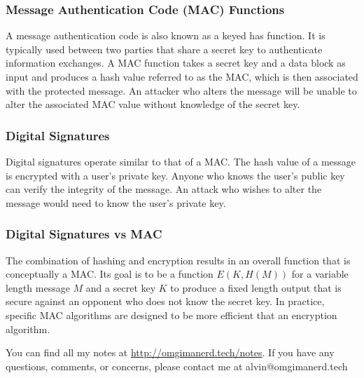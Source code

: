 \documentclass{math}
\begin{document}
\subsubsection*{Message Authentication Code (MAC) Functions}
A message authentication code is also known as a keyed has function. It is
typically used between two parties that share a secret key to authenticate
information exchanges. A MAC function takes a secret key and a data block as
input and produces a hash value referred to as the MAC, which is then associated
with the protected message. An attacker who alters the message will be unable to
alter the associated MAC value without knowledge of the secret key.

\subsubsection*{Digital Signatures}
Digital signatures operate similar to that of a MAC. The hash value of a message
is encrypted with a user's private key. Anyone who knows the user's public key
can verify the integrity of the message. An attack who wishes to alter the
message would need to know the user's private key.

\subsubsection*{Digital Signatures vs MAC}
The combination of hashing and encryption results in an overall function that is
conceptually a MAC. Its goal is to be a function \( E(K,H(M)) \) for a variable
length message \( M \) and a secret key \( K \) to produce a fixed length output
that is secure against an opponent who does not know the secret key. In
practice, specific MAC algorithms are designed to be more efficient that an
encryption algorithm.

\begin{center}
  You can find all my notes at \url{http://omgimanerd.tech/notes}. If you have
  any questions, comments, or concerns, please contact me at
  alvin@omgimanerd.tech
\end{center}
\end{document}

